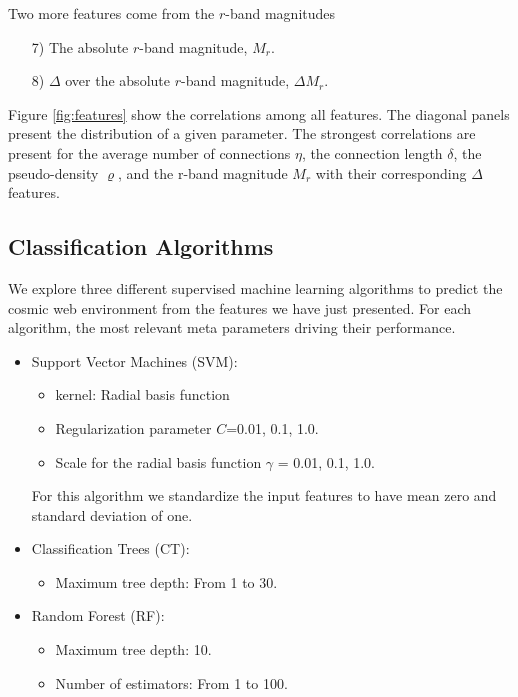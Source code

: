 \documentclass[usenatbib]{mnras}
\begin{document}
\noindent
Two more features come from the $r$-band magnitudes
\begin{enumerate}
\item[7)] The absolute $r$-band magnitude, $M_r$.
\item[8)] $\Delta$ over the absolute $r$-band magnitude, $\Delta M_r$.
\end{enumerate}

Figure \ref{fig:features} show the correlations among all features.
The diagonal panels present the distribution of a given parameter.
The strongest correlations are present for the average number of
connections $\eta$, the connection length $\delta$, the
pseudo-density $\varrho$, and the r-band magnitude $M_r$ with their
corresponding $\Delta$ features.



\subsection{Classification Algorithms}

We explore three different supervised machine learning algorithms to
predict the cosmic web environment from the features we have just presented.
For each algorithm, the most relevant meta parameters driving their
performance.

\begin{itemize}
    \item Support Vector Machines (SVM): 
        \begin{itemize}
            \item kernel: Radial basis function
            \item Regularization parameter $C$=0.01, 0.1, 1.0.
            \item Scale for the radial basis function  $\gamma$ = 0.01, 0.1, 1.0.
        \end{itemize}
        For this algorithm we standardize the input features to have
        mean zero and standard deviation of one. 
    \item Classification Trees (CT):
      \begin{itemize}
      \item Maximum tree depth: From 1 to 30.
      \end{itemize}
    \item Random Forest (RF):
        \begin{itemize}
            \item Maximum tree depth: 10.
            \item Number of estimators: From 1 to 100.
        \end{itemize}
\end{itemize}
\end{document}

